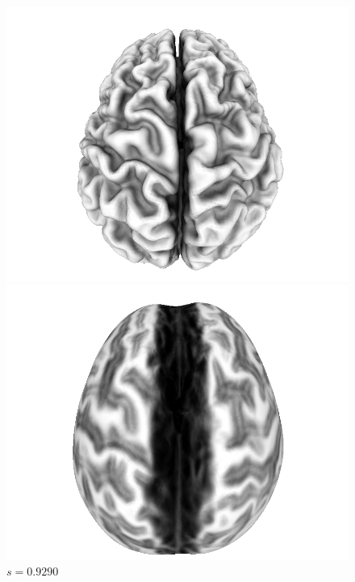 \documentclass[11pt]{amsart}
\begin{document}
\begin{figure}[H]
\begin{center}
\begin{minipage}[!h]{.27\textwidth}
\centering
\includegraphics[width=\textwidth]{subject1}
\caption*{$s = 0.5877$}
\end{minipage}%
\hfill
\begin{minipage}[!h]{0.27\textwidth}
\centering
\includegraphics[width=\textwidth]{subject1CMCF1}
\caption*{$s = 0.9290$} \label{fig:subjectcmcf1}
\end{minipage}%
\hfill
\begin{minipage}[!h]{0.27\textwidth}

\end{minipage}
\end{center}
\end{figure}
\end{document}
